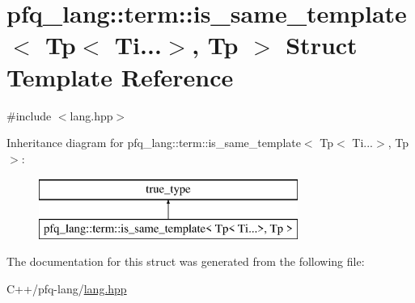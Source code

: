 \hypertarget{structpfq__lang_1_1term_1_1is__same__template_3_01Tp_3_01Ti_8_8_8_4_00_01Tp_01_4}{\section{pfq\+\_\+lang\+:\+:term\+:\+:is\+\_\+same\+\_\+template$<$ Tp$<$ Ti...$>$, Tp $>$ Struct Template Reference}
\label{structpfq__lang_1_1term_1_1is__same__template_3_01Tp_3_01Ti_8_8_8_4_00_01Tp_01_4}
}


{\ttfamily \#include $<$lang.\+hpp$>$}

Inheritance diagram for pfq\+\_\+lang\+:\+:term\+:\+:is\+\_\+same\+\_\+template$<$ Tp$<$ Ti...$>$, Tp $>$\+:\begin{figure}[H]
\begin{center}
\leavevmode
\includegraphics[height=2.000000cm]{structpfq__lang_1_1term_1_1is__same__template_3_01Tp_3_01Ti_8_8_8_4_00_01Tp_01_4}
\end{center}
\end{figure}


The documentation for this struct was generated from the following file\+:\begin{DoxyCompactItemize}
\item 
C++/pfq-\/lang/\hyperlink{lang_8hpp}{lang.\+hpp}\end{DoxyCompactItemize}
